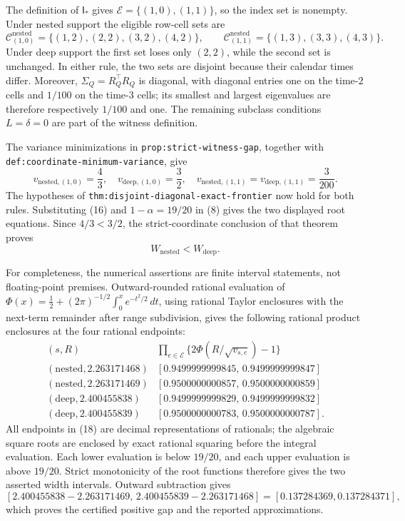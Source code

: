 The definition of \(\mathsf I_*\) gives \(\mathcal E=\{(1,0),(1,1)\}\), so
the index set is nonempty.  Under nested support the eligible row-cell sets
are
\[
 \mathcal C^{\mathrm{nested}}_{(1,0)}
 =\{(1,2),(2,2),(3,2),(4,2)\},
 \qquad
 \mathcal C^{\mathrm{nested}}_{(1,1)}
 =\{(1,3),(3,3),(4,3)\}.
\]
Under deep support the first set loses only \((2,2)\), while the second set is
unchanged.  In either rule, the two sets are disjoint because their calendar
times differ.  Moreover, \(\Sigma_Q=R_Q^{\top}R_Q\) is diagonal, with
diagonal entries one on the time-\(2\) cells and \(1/100\) on the time-\(3\)
cells; its smallest and largest eigenvalues are therefore respectively
\(1/100\) and one.  The remaining subclass conditions
\(L=\delta=0\) are part of the witness definition.

The variance minimizations in \texttt{prop:strict-witness-gap}, together with
\texttt{def:coordinate-minimum-variance}, give
\[
 v_{\mathrm{nested},(1,0)}=\frac43,
 \quad v_{\mathrm{deep},(1,0)}=\frac32,
 \quad
 v_{\mathrm{nested},(1,1)}=v_{\mathrm{deep},(1,1)}=\frac3{200}. \tag{16}
\]
The hypotheses of \texttt{thm:disjoint-diagonal-exact-frontier} now hold for
both rules.  Substituting (16) and \(1-\alpha=19/20\) in (8) gives the two
displayed root equations.  Since \(4/3<3/2\), the strict-coordinate conclusion
of that theorem proves
\[
 W_{\mathrm{nested}}<W_{\mathrm{deep}}. \tag{17}
\]

For completeness, the numerical assertions are finite interval statements,
not floating-point premises.  Outward-rounded rational evaluation of
\(\Phi(x)=\tfrac12+(2\pi)^{-1/2}\int_0^x e^{-t^2/2}\,dt\), using rational
Taylor enclosures with the next-term remainder after range subdivision, gives
the following rational product enclosures at the four rational endpoints:
\[
\begin{array}{c|c}
 (s,R)&
 \prod_{e\in\mathcal E}\{2\Phi(R/\sqrt{v_{s,e}})-1\}\\ \hline
 (\mathrm{nested},2.263171468)&
 [0.9499999999845,\,0.9499999999847]\\
 (\mathrm{nested},2.263171469)&
 [0.9500000000857,\,0.9500000000859]\\
 (\mathrm{deep},2.400455838)&
 [0.9499999999829,\,0.9499999999832]\\
 (\mathrm{deep},2.400455839)&
 [0.9500000000783,\,0.9500000000787].
\end{array} \tag{18}
\]
All endpoints in (18) are decimal representations of rationals; the algebraic
square roots are enclosed by exact rational squaring before the integral
evaluation.  Each lower evaluation is below \(19/20\), and each upper
evaluation is above \(19/20\).  Strict monotonicity of the root functions
therefore gives the two asserted width intervals.  Outward subtraction gives
\[
 [2.400455838-2.263171469,\,
   2.400455839-2.263171468]
 =[0.137284369,0.137284371],
\]
which proves the certified positive gap and the reported approximations.

